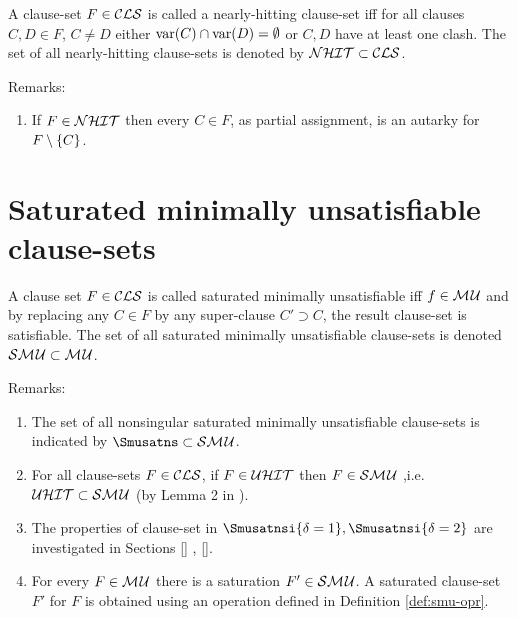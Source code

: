 \documentclass{report}
\begin{document}
 \begin{defi}\label{def:nhit-cls}
A clause-set $F \in \mathcal{CLS} $ is called a nearly-hitting clause-set iff for all clauses $C,D \in F$, $C \not = D$ either $\operatorname{var}(C) \cap \operatorname{var}(D) = \emptyset$ or $C,D$ have at least one clash. The set of all nearly-hitting clause-sets is denoted by $\mathcal{NHIT} \subset \mathcal{CLS}$.
\end{defi}
Remarks:
  \begin{enumerate}
  \item If $F \in \mathcal{NHIT}$ then every $C \in F$, as partial assignment, is an autarky for $F \setminus \{ C \}$.
  \end{enumerate}
    
\section{Saturated minimally unsatisfiable clause-sets}
\label{sec:smu}

\begin{defi}\label{def:smu}
A clause set $F \in \mathcal{CLS}$ is called saturated minimally unsatisfiable iff $f \in \mathcal{M\hspace{0.8pt}U} $ and by replacing any $C \in F$ by any super-clause $C' \supset C$, the result clause-set is satisfiable. The set of all saturated minimally unsatisfiable clause-sets is denoted $\mathcal{S}\mathcal{M\hspace{0.8pt}U} \subset \mathcal{M\hspace{0.8pt}U}$.
\end{defi}
Remarks:
  \begin{enumerate}
  \item The set of all nonsingular saturated minimally unsatisfiable clause-sets is indicated by $\Smusatns \subset \Smusat$.
  \item For all clause-sets $F \in \mathcal{CLS}$, if $F \in \mathcal{U}\mathcal{HIT}$ then $ F \in \mathcal{S}\mathcal{M\hspace{0.8pt}U}$ ,i.e. $\mathcal{U}\mathcal{HIT} \subset \mathcal{S}\mathcal{M\hspace{0.8pt}U}$ (by Lemma 2 in \cite{h29}). 
  \item The properties of clause-set in $\Smusatnsi{\delta=1}, \Smusatnsi{\delta=2}$ are investigated in Sections \ref{} , \ref{}.
  \item For every $F \in \mathcal{M\hspace{0.8pt}U}$ there is a saturation $F' \in \mathcal{S}\mathcal{M\hspace{0.8pt}U}$. A saturated clause-set  $F'$ for $F$ is obtained using an operation defined in Definition \ref{def:smu-opr}.
  \end{enumerate}
\end{document}
